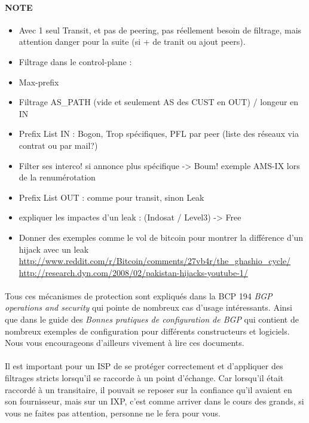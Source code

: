\paragraph{NOTE}
\begin{itemize}
\item Avec 1 seul Transit, et pas de peering, pas réellement besoin de filtrage, mais attention danger pour la suite (si + de tranit ou ajout peers).
\item Filtrage dans le control-plane : 
\item Max-prefix
\item Filtrage AS\_PATH (vide et seulement AS des CUST en OUT) / longeur en IN
\item Prefix List IN  : Bogon, Trop spécifiques, PFL par peer (liste des réseaux via contrat ou par mail?)
\item Filter ses interco! si annonce plus spécifique -> Boum! exemple AMS-IX lors de la renumérotation
\item Prefix List OUT : comme pour transit, sinon Leak
\item expliquer les impactes d'un leak :  (Indosat / Level3) -> Free
\item Donner des exemples comme le vol de bitcoin pour montrer la différence d'un hijack avec un leak
\url{http://www.reddit.com/r/Bitcoin/comments/27vb4r/the_ghashio_cycle/}
\url{http://research.dyn.com/2008/02/pakistan-hijacks-youtube-1/}
\end{itemize}

\paragraph{}
Tous ces mécanismes de protection sont expliqués dans la BCP 194 \emph{BGP operations and security} \cite{fenioux:BGPOPSEC} qui pointe de nombreux cas d'usage intéressants. Ainsi que dans le guide des \emph{Bonnes pratiques de configuration de BGP} \cite{fenioux:ANSSIBGP} qui contient de nombreux exemples de configuration pour différents constructeurs et logiciels. Nous vous encourageons d'ailleurs vivement à lire ces documents.

\paragraph{}
Il est important pour un ISP de se protéger correctement et d'appliquer des filtrages stricts lorsqu'il se raccorde à un point d'échange.
Car lorsqu'il était raccordé à un transitaire, il pouvait se reposer sur la confiance qu'il avaient en son fournisseur, mais sur un IXP, c'est comme arriver dans le cours des grands, si vous ne faites pas attention, personne ne le fera pour vous.

